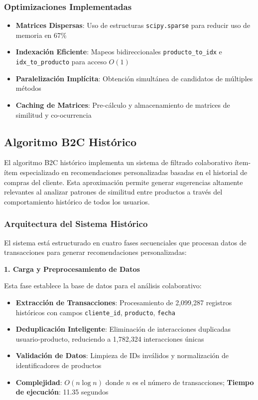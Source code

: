 \documentclass[twocolumn]{article}
\begin{document}
\subsubsection{Optimizaciones Implementadas}

\begin{itemize}
    \item \textbf{Matrices Dispersas}: Uso de estructuras \texttt{scipy.sparse} para reducir uso de memoria en 67\%
    \item \textbf{Indexación Eficiente}: Mapeos bidireccionales \texttt{producto\_to\_idx} e \texttt{idx\_to\_producto} para acceso \(O(1)\)
    \item \textbf{Paralelización Implícita}: Obtención simultánea de candidatos de múltiples métodos
    \item \textbf{Caching de Matrices}: Pre-cálculo y almacenamiento de matrices de similitud y co-ocurrencia
\end{itemize}

\subsection{Algoritmo B2C Histórico}

El algoritmo B2C histórico implementa un sistema de filtrado colaborativo ítem-ítem especializado en recomendaciones personalizadas basadas en el historial de compras del cliente. Esta aproximación permite generar sugerencias altamente relevantes al analizar patrones de similitud entre productos a través del comportamiento histórico de todos los usuarios.

\subsubsection{Arquitectura del Sistema Histórico}

El sistema está estructurado en cuatro fases secuenciales que procesan datos de transacciones para generar recomendaciones personalizadas:

\textbf{1. Carga y Preprocesamiento de Datos}

Esta fase establece la base de datos para el análisis colaborativo:

\begin{itemize}
    \item \textbf{Extracción de Transacciones}: Procesamiento de 2,099,287 registros históricos con campos \texttt{cliente\_id}, \texttt{producto}, \texttt{fecha}
    \item \textbf{Deduplicación Inteligente}: Eliminación de interacciones duplicadas usuario-producto, reduciendo a 1,782,324 interacciones únicas
    \item \textbf{Validación de Datos}: Limpieza de IDs inválidos y normalización de identificadores de productos
    \item \textbf{Complejidad}: \(O(n \log n)\) donde \(n\) es el número de transacciones; \textbf{Tiempo de ejecución}: 11.35 segundos
\end{itemize}
\end{document}
